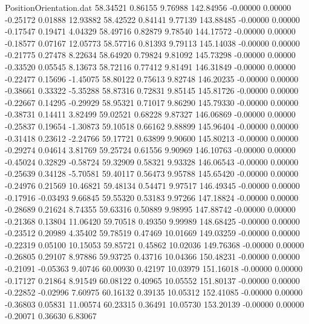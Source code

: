 \begin{filecontents}{PositionOrientation.dat}
  58.34521    0.86155    9.76988   142.84956   -0.00000    0.00000   -0.25172    0.01888   12.93882
  58.42522    0.84141    9.77139   143.88485   -0.00000    0.00000   -0.17547    0.19471    4.04329
  58.49716    0.82879    9.78540   144.17572   -0.00000    0.00000   -0.18577    0.07167   12.05773
  58.57716    0.81393    9.79113   145.14038   -0.00000    0.00000   -0.21775    0.27478    8.22634
  58.64920    0.79824    9.81092   145.73298   -0.00000    0.00000   -0.33520    0.05545    8.13673
  58.72116    0.77412    9.81491   146.31849   -0.00000    0.00000   -0.22477    0.15696   -1.45075
  58.80122    0.75613    9.82748   146.20235   -0.00000    0.00000   -0.38661    0.33322   -5.35288
  58.87316    0.72831    9.85145   145.81726   -0.00000    0.00000   -0.22667    0.14295   -0.29929
  58.95321    0.71017    9.86290   145.79330   -0.00000    0.00000   -0.38731    0.14411    3.82499
  59.02521    0.68228    9.87327   146.06869   -0.00000    0.00000   -0.25837    0.19654   -1.30873
  59.10518    0.66162    9.88899   145.96404   -0.00000    0.00000   -0.31418    0.23612   -2.24766
  59.17721    0.63899    9.90600   145.80213   -0.00000    0.00000   -0.29274    0.04614    3.81769
  59.25724    0.61556    9.90969   146.10763   -0.00000    0.00000   -0.45024    0.32829   -0.58724
  59.32909    0.58321    9.93328   146.06543   -0.00000    0.00000   -0.25639    0.34128   -5.70581
  59.40117    0.56473    9.95788   145.65420   -0.00000    0.00000   -0.24976    0.21569   10.46821
  59.48134    0.54471    9.97517   146.49345   -0.00000    0.00000   -0.17916   -0.03493    9.66845
  59.55320    0.53183    9.97266   147.18824   -0.00000    0.00000   -0.28689    0.21624    8.74355
  59.63316    0.50889    9.98995   147.88742   -0.00000    0.00000   -0.21368    0.13804   11.06420
  59.70518    0.49350    9.99989   148.68425   -0.00000    0.00000   -0.23512    0.20989    4.35402
  59.78519    0.47469   10.01669   149.03259   -0.00000    0.00000   -0.22319    0.05100   10.15053
  59.85721    0.45862   10.02036   149.76368   -0.00000    0.00000   -0.26805    0.29107    8.97886
  59.93725    0.43716   10.04366   150.48231   -0.00000    0.00000   -0.21091   -0.05363    9.40746
  60.00930    0.42197   10.03979   151.16018   -0.00000    0.00000   -0.17127    0.21864    8.91549
  60.08122    0.40965   10.05552   151.80137   -0.00000    0.00000   -0.22852   -0.02996    7.60975
  60.16132    0.39135   10.05312   152.41085   -0.00000    0.00000   -0.36803    0.05831   11.00574
  60.23315    0.36491   10.05730   153.20139   -0.00000    0.00000   -0.20071    0.36630    6.83067

\end{filecontents}
